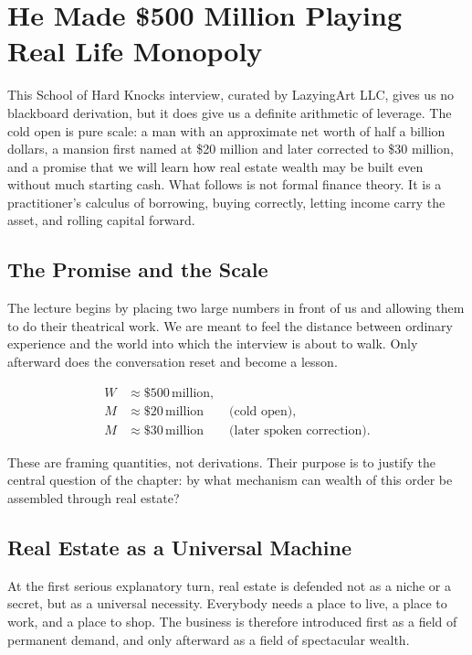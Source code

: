 \chapter{He Made \$500 Million Playing Real Life Monopoly}

This School of Hard Knocks interview, curated by LazyingArt LLC, gives us no blackboard derivation, but it does give us a definite arithmetic of leverage. The cold open is pure scale: a man with an approximate net worth of half a billion dollars, a mansion first named at \$20 million and later corrected to \$30 million, and a promise that we will learn how real estate wealth may be built even without much starting cash. What follows is not formal finance theory. It is a practitioner's calculus of borrowing, buying correctly, letting income carry the asset, and rolling capital forward.

\section{The Promise and the Scale}

The lecture begins by placing two large numbers in front of us and allowing them to do their theatrical work. We are meant to feel the distance between ordinary experience and the world into which the interview is about to walk. Only afterward does the conversation reset and become a lesson.

\begin{align}
W &\approx \$500\,\text{million},\\
M &\approx \$20\,\text{million}\qquad \text{(cold open)},\\
M &\approx \$30\,\text{million}\qquad \text{(later spoken correction)}.
\end{align}

These are framing quantities, not derivations. Their purpose is to justify the central question of the chapter: by what mechanism can wealth of this order be assembled through real estate?

\section{Real Estate as a Universal Machine}

At the first serious explanatory turn, real estate is defended not as a niche or a secret, but as a universal necessity. Everybody needs a place to live, a place to work, and a place to shop. The business is therefore introduced first as a field of permanent demand, and only afterward as a field of spectacular wealth.

